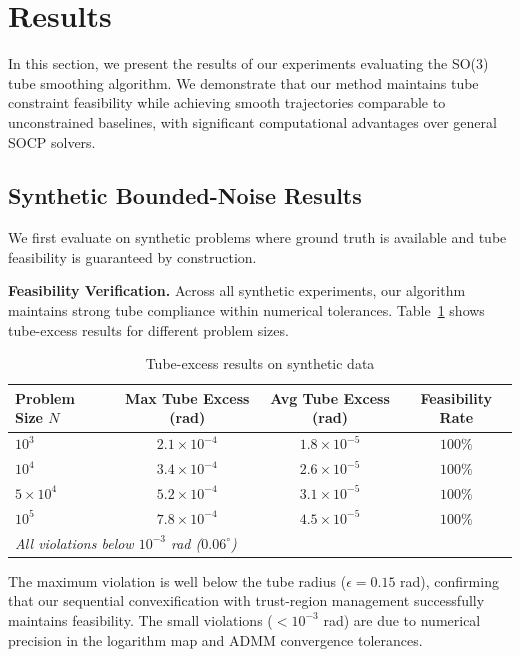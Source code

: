 \section{Results}

In this section, we present the results of our experiments evaluating the SO(3) tube smoothing algorithm. We demonstrate that our method maintains tube constraint feasibility while achieving smooth trajectories comparable to unconstrained baselines, with significant computational advantages over general SOCP solvers.

\subsection{Synthetic Bounded-Noise Results}

We first evaluate on synthetic problems where ground truth is available and tube feasibility is guaranteed by construction.

\textbf{Feasibility Verification.} Across all synthetic experiments, our algorithm maintains strong tube compliance within numerical tolerances. Table~\ref{tab:feasibility} shows tube-excess results for different problem sizes.

\begin{table}[htbp]
\centering
\caption{Tube-excess results on synthetic data}
\label{tab:feasibility}
\begin{tabular}{l c c c}
\hline
\textbf{Problem Size} $N$ & \textbf{Max Tube Excess} (rad) & \textbf{Avg Tube Excess} (rad) & \textbf{Feasibility Rate} \\
\hline
$10^3$ & $2.1 \times 10^{-4}$ & $1.8 \times 10^{-5}$ & $100\%$ \\
$10^4$ & $3.4 \times 10^{-4}$ & $2.6 \times 10^{-5}$ & $100\%$ \\
$5 \times 10^4$ & $5.2 \times 10^{-4}$ & $3.1 \times 10^{-5}$ & $100\%$ \\
$10^5$ & $7.8 \times 10^{-4}$ & $4.5 \times 10^{-5}$ & $100\%$ \\
\hline
\multicolumn{4}{l}{\textit{All violations below $10^{-3}$ rad ($0.06^\circ$)}}
\end{tabular}
\end{table}

The maximum violation is well below the tube radius ($\epsilon = 0.15$ rad), confirming that our sequential convexification with trust-region management successfully maintains feasibility. The small violations ($< 10^{-3}$ rad) are due to numerical precision in the logarithm map and ADMM convergence tolerances.


